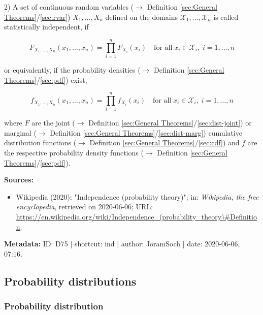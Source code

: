\documentclass[a4paper,12pt,twoside]{book}
\begin{document}
\vspace{1em}
2) A set of continuous random variables ($\rightarrow$ Definition \ref{sec:General Theorems}/\ref{sec:rvar}) $X_1, \ldots, X_n$ defined on the domains $\mathcal{X}_1, \ldots, \mathcal{X}_n$ is called statistically independent, if

\begin{equation} \label{eq:ind-cont-ind-F}
F_{X_1,\ldots,X_n}(x_1,\ldots,x_n) = \prod_{i=1}^{n} F_{X_i}(x_i) \quad \text{for all} \; x_i \in \mathcal{X}_i, \; i = 1, \ldots, n
\end{equation}

or equivalently, if the probability densities ($\rightarrow$ Definition \ref{sec:General Theorems}/\ref{sec:pdf}) exist,

\begin{equation} \label{eq:ind-cont-ind-f}
f_{X_1,\ldots,X_n}(x_1,\ldots,x_n) = \prod_{i=1}^{n} f_{X_i}(x_i) \quad \text{for all} \; x_i \in \mathcal{X}_i, \; i = 1, \ldots, n
\end{equation}

where $F$ are the joint ($\rightarrow$ Definition \ref{sec:General Theorems}/\ref{sec:dist-joint}) or marginal ($\rightarrow$ Definition \ref{sec:General Theorems}/\ref{sec:dist-marg}) cumulative distribution functions ($\rightarrow$ Definition \ref{sec:General Theorems}/\ref{sec:cdf}) and $f$ are the respective probability density functions ($\rightarrow$ Definition \ref{sec:General Theorems}/\ref{sec:pdf}).


\vspace{1em}
\textbf{Sources:}
\begin{itemize}
\item Wikipedia (2020): "Independence (probability theory)"; in: \textit{Wikipedia, the free encyclopedia}, retrieved on 2020-06-06; URL: \url{https://en.wikipedia.org/wiki/Independence_(probability_theory)#Definition}.
\end{itemize}


\vspace{1em}
\textbf{Metadata:} ID: D75 | shortcut: ind | author: JoramSoch | date: 2020-06-06, 07:16.
\vspace{1em}



\subsection{Probability distributions}

\subsubsection[\textit{Probability distribution}]{Probability distribution} \label{sec:dist}
\setcounter{equation}{0}
\end{document}
